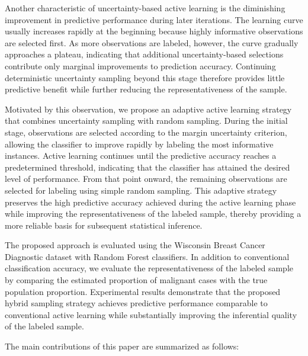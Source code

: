 \documentclass[twoside]{article}
\begin{document}
Another characteristic of uncertainty-based active learning is the diminishing improvement in predictive performance during later iterations. The learning curve usually increases rapidly at the beginning because highly informative observations are selected first. As more observations are labeled, however, the curve gradually approaches a plateau, indicating that additional uncertainty-based selections contribute only marginal improvements to prediction accuracy. Continuing deterministic uncertainty sampling beyond this stage therefore provides little predictive benefit while further reducing the representativeness of the sample.

Motivated by this observation, we propose an adaptive active learning strategy that combines uncertainty sampling with random sampling. During the initial stage, observations are selected according to the margin uncertainty criterion, allowing the classifier to improve rapidly by labeling the most informative instances. Active learning continues until the predictive accuracy reaches a predetermined threshold, indicating that the classifier has attained the desired level of performance. From that point onward, the remaining observations are selected for labeling using simple random sampling. This adaptive strategy preserves the high predictive accuracy achieved during the active learning phase while improving the representativeness of the labeled sample, thereby providing a more reliable basis for subsequent statistical inference.


The proposed approach is evaluated using the Wisconsin Breast Cancer Diagnostic dataset with Random Forest classifiers. In addition to conventional classification accuracy, we evaluate the representativeness of the labeled sample by comparing the estimated proportion of malignant cases with the true population proportion. Experimental results demonstrate that the proposed hybrid sampling strategy achieves predictive performance comparable to conventional active learning while substantially improving the inferential quality of the labeled sample.

The main contributions of this paper are summarized as follows:
\end{document}
